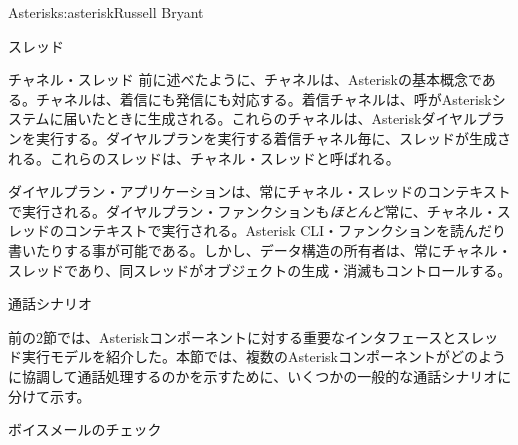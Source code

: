 \begin{aosachapter}{Asterisk}{s:asterisk}{Russell Bryant}
\begin{aosasect1}{スレッド}
\begin{aosasect2}{チャネル・スレッド}
前に述べたように、チャネルは、Asteriskの基本概念である。チャネルは、着信にも発信にも対応する。着信チャネルは、呼がAsteriskシステムに届いたときに生成される。これらのチャネルは、Asteriskダイヤルプランを実行する。ダイヤルプランを実行する着信チャネル毎に、スレッドが生成される。これらのスレッドは、チャネル・スレッドと呼ばれる。

ダイヤルプラン・アプリケーションは、常にチャネル・スレッドのコンテキストで実行される。ダイヤルプラン・ファンクションも\emph{ほとんど}常に、チャネル・スレッドのコンテキストで実行される。Asterisk CLI・ファンクションを読んだり書いたりする事が可能である。しかし、データ構造の所有者は、常にチャネル・スレッドであり、同スレッドがオブジェクトの生成・消滅もコントロールする。

\end{aosasect2}

\end{aosasect1}

\begin{aosasect1}{通話シナリオ}

前の2節では、Asteriskコンポーネントに対する重要なインタフェースとスレッド実行モデルを紹介した。本節では、複数のAsteriskコンポーネントがどのように協調して通話処理するのかを示すために、いくつかの一般的な通話シナリオに分けて示す。

\begin{aosasect2}{ボイスメールのチェック}


\end{aosasect2}
\end{aosasect1}
\end{aosachapter}
